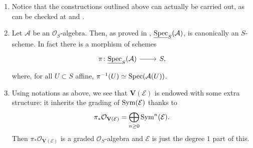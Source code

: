 \begin{rem}[]\leavevmode\vspace{-.2\baselineskip}
\begin{enumerate}
	\item Notice that the constructions outlined above can actually be carried out,
		as can be checked at 
		\cite[\href{https://stacks.math.columbia.edu/tag/01LL}{Section 01LL}]{SP}
		and
		\cite[\href{https://stacks.math.columbia.edu/tag/01M1}{Section 01M1}]{SP}.

	\item Let $\mathcal{A}$ be an $\mathcal{O}_{ S }$-algebra. 
		Then, as proved in 
		\cite[\href{https://stacks.math.columbia.edu/tag/01LP}{Lemma 01LP}]{SP},
		$\underline{\operatorname{Spec}}_S(\mathcal{A})$, is canonically an $S$-scheme.
		In fact there is a morphism of schemes
		\begin{equation*}
		\begin{tikzcd}[row sep = 0ex
			,/tikz/column 1/.append style={anchor=base east}
			,/tikz/column 2/.append style={anchor=base west}]
			\pi\colon \underline{\spec}_S(\mathcal{A})
			\arrow[r, "", rightarrow] &
			S
		,\end{tikzcd}
		\end{equation*} 
		where, for all $U \subset S$ affine, $\pi^{-1}(U) \simeq \operatorname{Spec}(\mathcal{A}(U))$.

	\item Using notations as above, we see that $\mathbf{V}(\mathcal{E})$ is endowed with
		some extra structure: it inherits the grading of $\operatorname{Sym}(\mathcal{E})$
		thanks to
		\begin{equation*}
			\pi_* \mathcal{O}_{ \mathbf{V}(\mathcal{E}) } =
			\bigoplus_{n \geq 0} \operatorname{Sym}^n (\mathcal{E})
		.\end{equation*}
		Then $\pi_* \mathcal{O}_{ \mathbf{V}(\mathcal{E}) }$ is a graded
		$\mathcal{O}_{ S }$-algebra and $\mathcal{E}$ is just the degree $1$ part
		of this.
\end{enumerate}
\end{rem}


